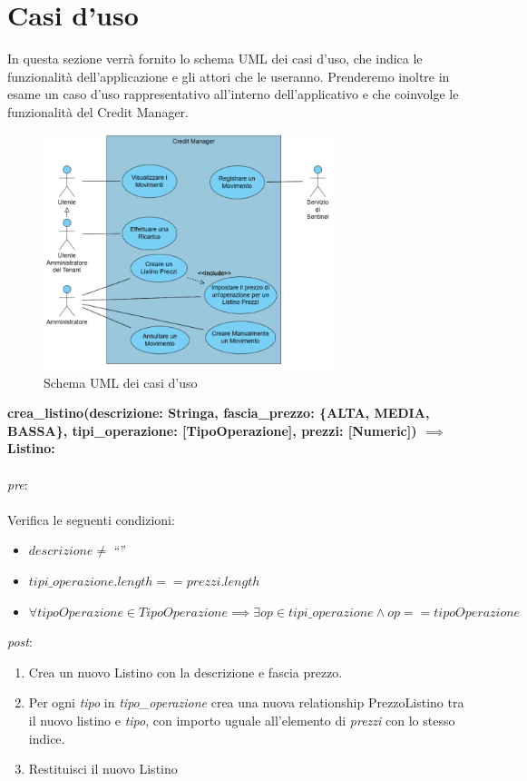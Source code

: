 \section{Casi d'uso}
In questa sezione verrà fornito lo schema UML dei casi d'uso, che indica le funzionalit\`a dell'applicazione e gli attori che le useranno. Prenderemo inoltre in esame
un caso d'uso rappresentativo all'interno dell'applicativo e che coinvolge le funzionalit\`a del Credit Manager.
\begin{figure}[H]
  \centering
  \includegraphics[width=8.5cm]{images/db-diagrams/use-case-diagram.jpg}
  \caption{Schema UML dei casi d'uso}
\end{figure}

\textbf{crea\_listino(descrizione: Stringa, fascia\_prezzo: \{ALTA, MEDIA,\\BASSA\}, tipi\_operazione: [TipoOperazione], prezzi: [Numeric]) $\implies$ Listino:}\\\\
\textit{pre}:\\\\
\hspace*{0.5 cm}Verifica le seguenti condizioni:
\begin{itemize}
  \item $descrizione \neq$ ``''
  \item $tipi\_operazione.length == prezzi.length$
  \item $\forall tipoOperazione \in Tipo Operazione \implies \exists op \in tipi\_operazione \land op == tipoOperazione $
\end{itemize}
\textit{post}:
\begin{enumerate}
  \item Crea un nuovo Listino con la descrizione e fascia prezzo.
  \item Per ogni \textit{tipo} in \textit{tipo\_operazione} crea una nuova relationship PrezzoListino tra il nuovo listino e \textit{tipo},
    con importo uguale all'elemento di \textit{prezzi} con lo stesso indice.
  \item Restituisci il nuovo Listino
\end{enumerate}
